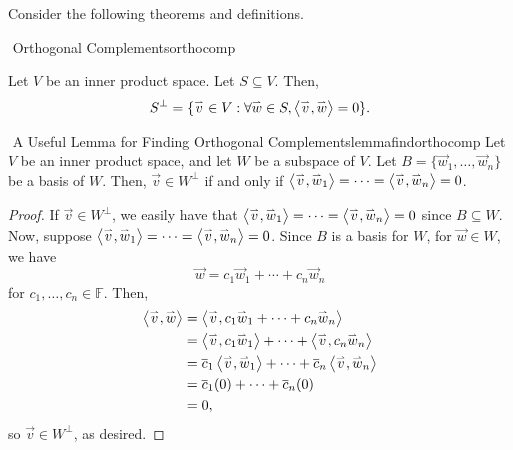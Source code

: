         Consider the following theorems and definitions.
        \begin{definition}{\Stop\,\,Orthogonal Complements}{orthocomp}

            Let \(V\) be an inner product space. Let \(S\subseteq V\). Then,
            \begin{equation*}
                S^{\perp}=\{\vec{v}\in V:\forall \vec{w}\in S, \iprod{\vec{v}}{\vec{w}}=0\}.
            \end{equation*}

        \end{definition}
        \begin{theorem}{\Stop\,\,A Useful Lemma for Finding Orthogonal Complements}{lemmafindorthocomp}
            Let \(V\) be an inner product space, and let \(W\) be a subspace of \(V\). Let \(B=\{\vec{w}_1,\ldots,\vec{w}_n\}\) be a basis of \(W\). Then, \(\vec{v}\in W^\perp\) if and only if \(\iprod{\vec{v}}{\vec{w}_1}=\cdots=\iprod{\vec{v}}{\vec{w}_n}=0\).
            \begin{proof}
                If \(\vec{v}\in W^\perp\), we easily have that \(\iprod{\vec{v}}{\vec{w}_1}=\cdots=\iprod{\vec{v}}{\vec{w}_n}=0\) since \(B\subseteq W\). Now, suppose \(\iprod{\vec{v}}{\vec{w}_1}=\cdots=\iprod{\vec{v}}{\vec{w}_n}=0\). Since \(B\) is a basis for \(W\), for \(\vec{w}\in W\), we have
                \begin{equation*}
                    \vec{w}=c_1\vec{w}_1+\cdots+c_n\vec{w}_n
                \end{equation*}
                for \(c_1,\ldots,c_n\in\mathbb{F}\). Then,
                \begin{align*}
                    \iprod{\vec{v}}{\vec{w}}&=\iprod{\vec{v}}{c_1\vec{w}_1+\cdots+c_n\vec{w}_n} \\
                    &=\iprod{\vec{v}}{c_1\vec{w}_1}+\cdots+\iprod{\vec{v}}{c_n\vec{w}_n} \\
                    &=\bar{c}_1\iprod{\vec{v}}{\vec{w}_1}+\cdots+\bar{c}_n\iprod{\vec{v}}{\vec{w}_n} \\
                    &=\bar{c}_1(0)+\cdots+\bar{c}_n(0) \\
                    &=0,
                \end{align*}
                so \(\vec{v}\in W^\perp\), as desired.
            \end{proof}
        \end{theorem}
        \vphantom
        \\
        \\
